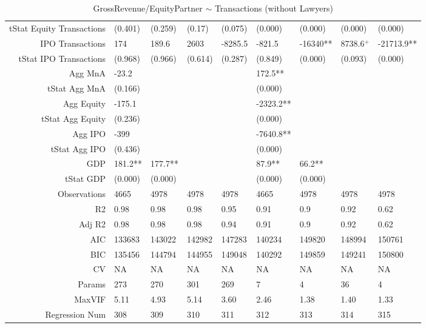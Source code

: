 \begin{table}[ht]
\begin{tabular}{rllllllll}
  tStat Equity Transactions & (0.401) & (0.259) & (0.17) & (0.075) & (0.000) & (0.000) & (0.000) & (0.000) \\ 
  IPO Transactions & 174 & 189.6 & 2603 & -8285.5 & -821.5 & -16340** & 8738.6$^{+}$ & -21713.9** \\ 
  tStat IPO Transactions & (0.968) & (0.966) & (0.614) & (0.287) & (0.849) & (0.000) & (0.093) & (0.000) \\ 
  Agg MnA & -23.2 &  &  &  & 172.5** &  &  &  \\ 
  tStat Agg MnA & (0.166) &  &  &  & (0.000) &  &  &  \\ 
  Agg Equity & -175.1 &  &  &  & -2323.2** &  &  &  \\ 
  tStat Agg Equity & (0.236) &  &  &  & (0.000) &  &  &  \\ 
  Agg IPO & -399 &  &  &  & -7640.8** &  &  &  \\ 
  tStat Agg IPO & (0.436) &  &  &  & (0.000) &  &  &  \\ 
  GDP & 181.2** & 177.7** &  &  & 87.9** & 66.2** &  &  \\ 
  tStat GDP & (0.000) & (0.000) &  &  & (0.000) & (0.000) &  &  \\ 
  Observations & 4665 & 4978 & 4978 & 4978 & 4665 & 4978 & 4978 & 4978 \\ 
  R2 & 0.98 & 0.98 & 0.98 & 0.95 & 0.91 & 0.9 & 0.92 & 0.62 \\ 
  Adj R2 & 0.98 & 0.98 & 0.98 & 0.94 & 0.91 & 0.9 & 0.92 & 0.62 \\ 
  AIC & 133683 & 143022 & 142982 & 147283 & 140234 & 149820 & 148994 & 150761 \\ 
  BIC & 135456 & 144794 & 144955 & 149048 & 140292 & 149859 & 149241 & 150800 \\ 
  CV & NA & NA & NA & NA & NA & NA & NA & NA \\ 
  Params & 273 & 270 & 301 & 269 & 7 & 4 & 36 & 4 \\ 
  MaxVIF & 5.11 & 4.93 & 5.14 & 3.60 & 2.46 & 1.38 & 1.40 & 1.33 \\ 
  Regression Num & 308 & 309 & 310 & 311 & 312 & 313 & 314 & 315 \\ 
   \hline
\end{tabular}
\caption{GrossRevenue/EquityPartner $\sim$ Transactions (without Lawyers)} 
\end{table}
